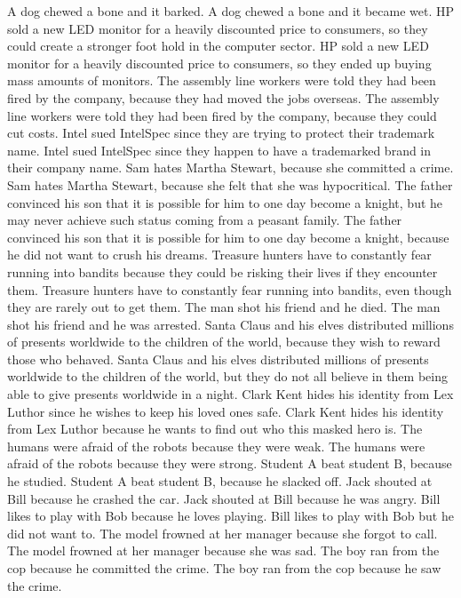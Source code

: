 \documentclass{article}
\begin{document}
\begin{enumerate}
	A dog chewed a bone and it barked.
	A dog chewed a bone and it became wet.
	HP sold a new LED monitor for a heavily discounted price to consumers, so they could create a stronger foot hold in the computer sector.
	HP sold a new LED monitor for a heavily discounted price to consumers, so they ended up buying mass amounts of monitors.
	The assembly line workers were told they had been fired by the company, because they had moved the jobs overseas.
	The assembly line workers were told they had been fired by the company, because they could cut costs.
	Intel sued IntelSpec since they are trying to protect their trademark name.
	Intel sued IntelSpec since they happen to have a trademarked brand in their company name.
	Sam hates Martha Stewart, because she committed a crime.
	Sam hates Martha Stewart, because she felt that she was hypocritical.
	The father convinced his son that it is possible for him to one day become a knight, but he may never achieve such status coming from a peasant family.
	The father convinced his son that it is possible for him to one day become a knight, because he did not want to crush his dreams.
	Treasure hunters have to constantly fear running into bandits because they could be risking their lives if they encounter them.
	Treasure hunters have to constantly fear running into bandits, even though they are rarely out to get them.
	The man shot his friend and he died.
	The man shot his friend and he was arrested.
	Santa Claus and his elves distributed millions of presents worldwide to the children of the world, because they wish to reward those who behaved.
	Santa Claus and his elves distributed millions of presents worldwide to the children of the world, but they do not all believe in them being able to give presents worldwide in a night.
	Clark Kent hides his identity from Lex Luthor since he wishes to keep his loved ones safe.
	Clark Kent hides his identity from Lex Luthor because he wants to find out who this masked hero is.
	The humans were afraid of the robots because they were weak.
	The humans were afraid of the robots because they were strong.
	Student A beat student B, because he studied.
	Student A beat student B, because he slacked off.
	Jack shouted at Bill because he crashed the car.
	Jack shouted at Bill because he was angry.
	Bill likes to play with Bob because he loves playing.
	Bill likes to play with Bob but he did not want to.
	The model frowned at her manager because she forgot to call.
	The model frowned at her manager because she was sad.
	The boy ran from the cop because he committed the crime.
	The boy ran from the cop because he saw the crime.

\end{enumerate}
\end{document}
